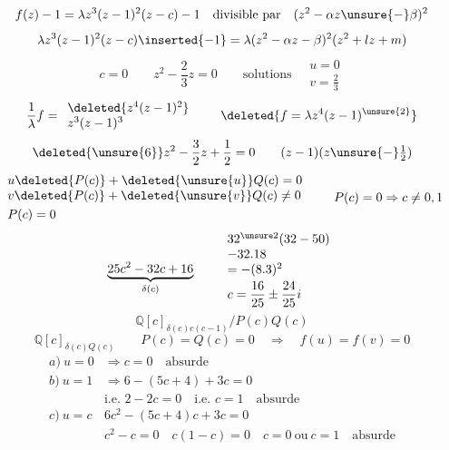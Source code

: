 \[
f(z)-1=\lambda z^3(z-1)^2(z-c)-1\quad\text{divisible par}\quad
(z^2-\alpha z\unsure{-}\beta)^2
\]
\[
\lambda z^3(z-1)^2(z-c)\inserted{-1}=\lambda(z^2-\alpha z-\beta)^2(z^2+lz+m)
\]
\[
c=0\qquad z^2-\frac23z=0\qquad\text{solutions}\quad
\begin{array}{l}u=0\\v=\frac23\end{array}
\]
\[
\frac1\lambda f=\begin{array}{l}\deleted{z^4(z-1)^2}\\z^3(z-1)^3\end{array}
\qquad \deleted{f=\lambda z^4(z-1)^{\unsure{2}}}
\]
\[
\deleted{\unsure{6}}z^2-\frac32z+\frac12=0
\qquad(z-1)(z\unsure{-}\tfrac12)
\]
\[
\begin{array}{l}
u\deleted{P(c)}+\deleted{\unsure{u}}Q(c)=0\\
v\deleted{P(c)}+\deleted{\unsure{v}}Q(c)\ne0\\[3pt]
P(c)=0
\end{array}
\qquad P(c)=0\Rightarrow c\ne0,1
\]
\[
\underbrace{25c^2-32c+16}_{\delta(c)}
\qquad\begin{array}{l}32^{\unsure2}(32-50)\\-32.18\\=-(8.3)^2\\[3pt]
c=\dfrac{16}{25}\pm\dfrac{24}{25}i\end{array}
\]
\[
\mathbb Q[c]_{\delta(c)c(c-1)}/P(c)Q(c)
\]
\[
\mathbb Q[c]_{\delta(c)Q(c)}
\qquad P(c)=Q(c)=0\quad\Rightarrow\quad f(u)=f(v)=0
\]
\[
\begin{array}{ll}
a)\ u=0&\Rightarrow c=0\quad\text{absurde}\\
b)\ u=1&\Rightarrow 6-(5c+4)+3c=0\\
&\text{i.e. }2-2c=0\quad\text{i.e. }c=1\quad\text{absurde}\\
c)\ u=c&6c^2-(5c+4)c+3c=0\\
&c^2-c=0\quad c(1-c)=0\quad c=0\ \text{ou}\ c=1\quad\text{absurde}
\end{array}
\]
